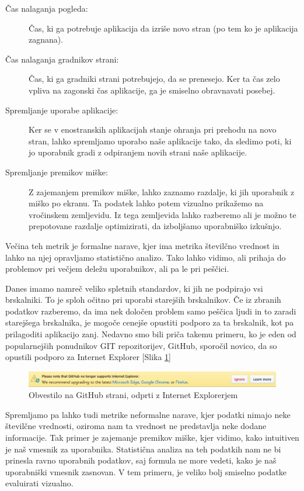 \documentclass[a4paper, 12pt]{book}
\begin{document}
\begin{description}
	\item[Čas nalaganja pogleda:] Čas, ki ga potrebuje aplikacija da izriše novo stran (po tem ko je aplikacija zagnana).
	\item[Čas nalaganja gradnikov strani:] Čas, ki ga gradniki strani potrebujejo, da se prenesejo. Ker ta čas zelo vpliva na zagonski čas aplikacije, ga je smiselno obravnavati posebej.
	\item[Spremljanje uporabe aplikacije:] Ker se v enostranskih aplikacijah stanje ohranja pri prehodu na novo stran, lahko spremljamo uporabo naše aplikacije tako, da sledimo poti, ki jo uporabnik gradi z odpiranjem novih strani naše aplikacije.
	\item[Spremljanje premikov miške:] Z zajemanjem premikov miške, lahko zaznamo razdalje, ki jih uporabnik  z miško po ekranu. Ta podatek lahko potem vizualno prikažemo na vročinskem zemljevidu. Iz tega zemljevida lahko razberemo ali je možno te prepotovane razdalje optimizirati, da izboljšamo uporabniško izkušnjo.
\end{description}

Večina teh metrik je formalne narave, kjer ima metrika številčno vrednost in lahko na njej opravljamo statistično analizo. Tako lahko vidimo, ali prihaja do problemov pri večjem deležu uporabnikov, ali pa le pri peščici.

Danes imamo namreč veliko spletnih standardov, ki jih ne podpirajo vsi brskalniki. To je sploh očitno pri uporabi starejših brskalnikov. Če iz zbranih podatkov razberemo, da ima nek določen problem samo peščica ljudi in to zaradi starejšega brskalnika, je mogoče cenejše opustiti podporo za ta brskalnik, kot pa prilagoditi aplikacijo zanj. Nedavno smo bili priča takemu primeru, ko je eden od popularnejših ponudnikov GIT repozitorijev, GitHub, sporočil novico, da so opustili podporo za Internet Explorer [Slika \ref{img:github_ie}]

\begin{figure}[h]
	\begin{center}
		\includegraphics[width=1\textwidth]{github_end_support.png}
	\end{center}
	\caption{Obvestilo na GitHub strani, odprti z Internet Explorerjem}
	\label{img:github_ie}
\end{figure}

Spremljamo pa lahko tudi metrike neformalne narave, kjer podatki nimajo neke številčne vrednosti, oziroma nam ta vrednost ne predstavlja neke dodane informacije. Tak primer je zajemanje premikov miške, kjer vidimo, kako intuitiven je naš vmesnik za uporabnika. Statistična analiza na teh podatkih nam ne bi prinesla ravno uporabnih podatkov, saj formula ne more vedeti, kako je naš uporabniški vmesnik zasnovan. V tem primeru, je veliko bolj smiselno podatke evaluirati vizualno.
\end{document}
